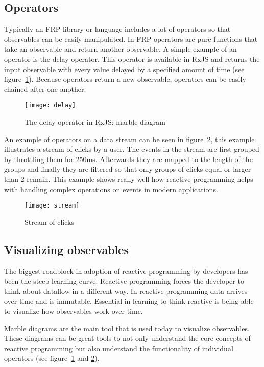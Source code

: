 \subsection{Operators}

Typically an FRP library or language includes a lot of operators \cite{intro-reactive} so that observables can be easily manipulated. In FRP operators are pure functions that take an observable and return another observable. A simple example of an operator is the delay operator. This operator is available in RxJS and returns the input observable with every value delayed by a specified amount of time \cite{delay} (see figure~\ref{figure:delay}). Because operators return a new observable, operators can be easily chained after one another.

\begin{figure}[H]
	\centering
	\texttt{[image: delay]}
	\caption{The delay operator in RxJS: marble diagram \cite{delay}}
	\label{figure:delay}
\end{figure}

An example of operators on a data stream can be seen in figure~\ref{figure:stream}, this example illustrates a stream of clicks by a user. The events in the stream are first grouped by throttling them for 250ms. Afterwards they are mapped to the length of the groups and finally they are filtered so that only groups of clicks equal or larger than 2 remain. This example shows really well how reactive programming helps with handling complex operations on events in modern applications.

\begin{figure}[H]
	\centering
	\texttt{[image: stream]}
	\caption{Stream of clicks \cite{intro-reactive}}
	\label{figure:stream}
\end{figure}

\subsection{Visualizing observables}

The biggest roadblock in adoption of reactive programming by developers has been the steep learning curve. Reactive programming forces the developer to think about dataflow in a different way. In reactive programming data arrives over time and is immutable. Essential in learning to think reactive is being able to visualize how observables work over time.

Marble diagrams are the main tool that is used today to visualize observables. These diagrams can be great tools to not only understand the core concepts of reactive programming but also understand the functionality of individual operators (see figure~\ref{figure:delay} and \ref{figure:stream}).

